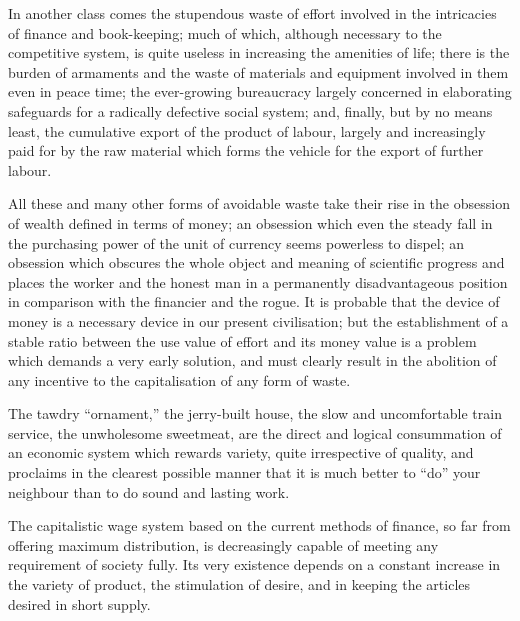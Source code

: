 \documentclass{book}
\begin{document}
In another class comes the stupendous waste of effort involved in the intricacies of finance and book-keeping; much of which, although necessary to the competitive system, is quite useless in increasing the amenities of life; there is the burden of armaments and the waste of materials and equipment involved in them even in peace time; the ever-growing bureaucracy largely concerned in elaborating safeguards for a radically defective social system; and, finally, but by no means least, the cumulative export of the product of labour, largely and increasingly paid for by the raw material which forms the vehicle for the export of further labour.

All these and many other forms of avoidable waste take their rise in the obsession of wealth defined in terms of money; an obsession which even the steady fall in the purchasing power of the unit of currency seems powerless to dispel; an obsession which obscures the whole object and meaning of scientific progress and places the worker and the honest man in a permanently disadvantageous position in comparison with the financier and the rogue. It is probable that the device of money is a necessary device in our present civilisation; but the establishment of a stable ratio between the use value of effort and its money value is a problem which demands a very early solution, and must clearly result in the abolition of any incentive to the capitalisation of any form of waste.

The tawdry “ornament,” the jerry-built house, the slow and uncomfortable train service, the unwholesome sweetmeat, are the direct and logical consummation of an economic system which rewards variety, quite irrespective of quality, and proclaims in the clearest possible manner that it is much better to “do” your neighbour than to do sound and lasting work.

The capitalistic wage system based on the current methods of finance, so far from offering maximum distribution, is decreasingly capable of meeting any requirement of society fully. Its very existence depends on a constant increase in the variety of product, the stimulation of desire, and in keeping the articles desired in short supply.
\end{document}

